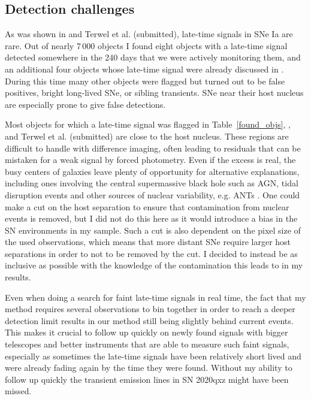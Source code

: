 \documentclass[a4paper,oneside,12pt, class=Latex/Classes/PhDthesisPSnPDF, crop=false]{standalone}
\begin{document}
\subsection{Detection challenges}
As was shown in \citet{Terwel_2024_paper1} and Terwel et al. (submitted), late-time signals in SNe Ia are rare. Out of nearly 7\,000 objects I found eight objects with a late-time signal detected somewhere in the 240 days that we were actively monitoring them, and an additional four objects whose late-time signal were already discussed in \citet{Terwel_2024_paper1}. During this time many other objects were flagged but turned out to be false positives, bright long-lived SNe, or sibling transients. SNe near their host nucleus are especially prone to give false detections.

Most objects for which a late-time signal was flagged in Table~\ref{found_objs}, \citet{Terwel_2024_paper1}, and Terwel et al. (submitted) are close to the host nucleus. These regions are difficult to handle with difference imaging, often leading to residuals that can be mistaken for a weak signal by forced photometry. Even if the excess is real, the busy centers of galaxies leave plenty of opportunity for alternative explanations, including ones involving the central supermassive black hole such as AGN, tidal disruption events and other sources of nuclear variability, e.g. ANTs \citep{2020ohl_Hinkle}. One could make a cut on the host separation to ensure that contamination from nuclear events is removed, but I did not do this here as it would introduce a bias in the SN environments in my sample. Such a cut is also dependent on the pixel size of the used observations, which means that more distant SNe require larger host separations in order to not to be removed by the cut. I decided to instead be as inclusive as possible with the knowledge of the contamination this leads to in my results.

Even when doing a search for faint late-time signals in real time, the fact that my method requires several observations to bin together in order to reach a deeper detection limit results in our method still being slightly behind current events. This makes it crucial to follow up quickly on newly found signals with bigger telescopes and better instruments that are able to measure such faint signals, especially as sometimes the late-time signals have been relatively short lived and were already fading again by the time they were found. Without my ability to follow up quickly the transient emission lines in SN 2020qxz might have been missed.
\end{document}
